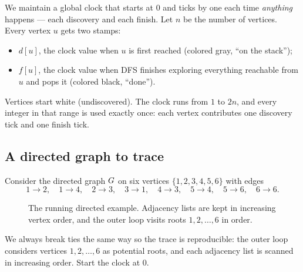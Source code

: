 We maintain a global clock that starts at $0$ and ticks by one each time \emph{anything} happens --- each discovery and each finish. Let $n$ be the number of vertices. Every vertex $u$ gets two stamps:
\begin{itemize}
  \item $d[u]$, the clock value when $u$ is first reached (colored gray, ``on the stack'');
  \item $f[u]$, the clock value when DFS finishes exploring everything reachable from $u$ and pops it (colored black, ``done'').
\end{itemize}
Vertices start white (undiscovered). The clock runs from $1$ to $2n$, and every integer in that range is used exactly once: each vertex contributes one discovery tick and one finish tick.

\subsection{A directed graph to trace}

Consider the directed graph $G$ on six vertices $\{1,2,3,4,5,6\}$ with edges
\[
1\to2,\quad 1\to4,\quad 2\to3,\quad 3\to1,\quad 4\to3,\quad 5\to4,\quad 5\to6,\quad 6\to6.
\]

\begin{figure}[H]
\centering
{}
\caption{The running directed example. Adjacency lists are kept in increasing vertex order, and the outer loop visits roots $1,2,\dots,6$ in order.}
\label{ch03:fig-digraph}
\end{figure}

We always break ties the same way so the trace is reproducible: the outer loop considers vertices $1,2,\dots,6$ as potential roots, and each adjacency list is scanned in increasing order. Start the clock at $0$.

